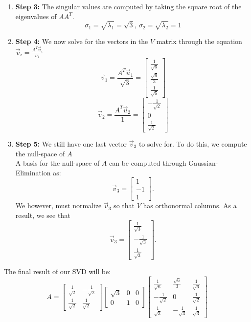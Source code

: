 \begin{enumerate}
{\begin{enumerate}[label=(\roman*)]
        Remember to normalize these vectors since they form the $U$ matrix.
      \item \textbf{Step 3:}
        The singular values are computed by taking the square root of the eigenvalues of $AA^{T}.$
        $$\sigma_{1} = \sqrt{\lambda_{1}} = \sqrt{3}, \ \sigma_{2} = \sqrt{\lambda_{2}} = 1$$
      \item \textbf{Step 4:}
        We now solve for the vectors in the $V$ matrix through the equation $\vec{v}_i = \frac{A^{T} \vec{u}_i}{\sigma_i}$
        $$\vec{v}_{1} = \frac{A^{T} \vec{u}_{1}}{\sqrt{3}} =
        \begin{bmatrix} \frac{1}{\sqrt{6}} \\ \frac{\sqrt{6}}{3} \\ \frac{1}{\sqrt{6}} \end{bmatrix}$$
        $$\vec{v}_{2} = \frac{A^{T} \vec{u}_{2}}{1} =
        \begin{bmatrix} -\frac{1}{\sqrt{2}} \\ 0 \\ \frac{1}{\sqrt{2}} \end{bmatrix}$$
      \item \textbf{Step 5:}
        We still have one last vector $\vec{v}_{3}$ to solve for. To do this, we compute the null-space of $A$ \\
        A basis for the null-space of $A$ can be computed through Gaussian-Elimination as:
        $$\vec{v}_{3} = \begin{bmatrix} 1 \\ -1 \\ 1 \end{bmatrix}.$$
        We however, must normalize $\vec{v}_{3}$ so that $V$ has orthonormal columns. As a result, we see that
        $$\vec{v}_{3} = \begin{bmatrix} \frac{1}{\sqrt{3}} \\ - \frac{1}{\sqrt{3}} \\ \frac{1}{\sqrt{3}} \end{bmatrix}.$$
    \end{enumerate}
    The final result of our SVD will be:
    \begin{equation}
      A = \begin{bmatrix} \frac{1}{\sqrt{2}} & -\frac{1}{\sqrt{2}} \\ \frac{1}{\sqrt{2}} & \frac{1}{\sqrt{2}} \end{bmatrix}
      \begin{bmatrix} \sqrt{3} & 0 & 0 \\ 0 & 1 & 0 \end{bmatrix}
      \begin{bmatrix} \frac{1}{\sqrt{6}} & \frac{\sqrt{6}}{3} & \frac{1}{\sqrt{6}} \\
      -\frac{1}{\sqrt{2}} & 0 & \frac{1}{\sqrt{2}} \\
      \frac{1}{\sqrt{3}} & - \frac{1}{\sqrt{3}} & \frac{1}{\sqrt{3}} \end{bmatrix}
    \end{equation}
  }


\end{enumerate}
